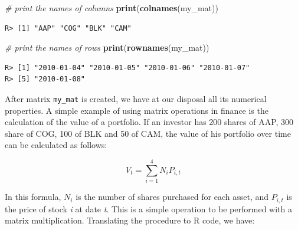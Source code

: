\documentclass[
  12pt,
]{book}
\newenvironment{Shaded}{\begin{snugshade}}{\end{snugshade}}
\newcommand{\CommentTok}[1]{\textcolor[rgb]{0.37,0.37,0.37}{\textit{#1}}}
\newcommand{\DataTypeTok}[1]{\textcolor[rgb]{0.27,0.27,0.27}{#1}}
\newcommand{\DecValTok}[1]{\textcolor[rgb]{0.06,0.06,0.06}{#1}}
\newcommand{\KeywordTok}[1]{\textcolor[rgb]{0.27,0.27,0.27}{\textbf{#1}}}
\newcommand{\NormalTok}[1]{#1}
\newcommand{\OperatorTok}[1]{\textcolor[rgb]{0.43,0.43,0.43}{\textbf{#1}}}
\newcommand{\StringTok}[1]{\textcolor[rgb]{0.5,0.5,0.5}{#1}}
\begin{document}
\begin{Shaded}
\begin{Highlighting}[]
\CommentTok{# print the names of columns }
\KeywordTok{print}\NormalTok{(}\KeywordTok{colnames}\NormalTok{(my_mat))}
\end{Highlighting}
\end{Shaded}

\begin{verbatim}
R> [1] "AAP" "COG" "BLK" "CAM"
\end{verbatim}

\begin{Shaded}
\begin{Highlighting}[]
\CommentTok{# print the names of rows}
\KeywordTok{print}\NormalTok{(}\KeywordTok{rownames}\NormalTok{(my_mat))}
\end{Highlighting}
\end{Shaded}

\begin{verbatim}
R> [1] "2010-01-04" "2010-01-05" "2010-01-06" "2010-01-07"
R> [5] "2010-01-08"
\end{verbatim}

After matrix \texttt{my\_mat} is created, we have at our disposal all its numerical properties. A simple example of using matrix operations in finance is the calculation of the value of a portfolio. If an investor has 200 shares of AAP, 300 share of COG, 100 of BLK and 50 of CAM, the value of his portfolio over time can be calculated as follows:

\[V _t = \sum _{i=1} ^{4} N _i P_{i,t}\]

In this formula, \(N_i\) is the number of shares purchased for each asset, and \(P_{i,t}\) is the price of stock \emph{i} at date \emph{t}. This is a simple operation to be performed with a matrix multiplication. Translating the procedure to R code, we have:

\begin{Shaded}
\end{Shaded}
\end{document}
